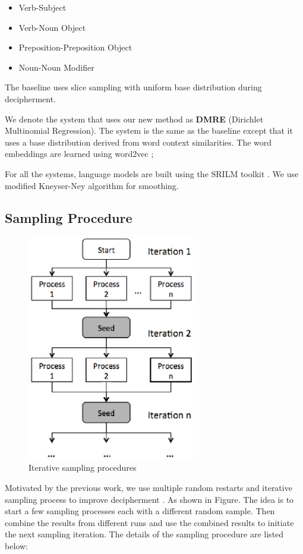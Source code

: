 \begin{itemize}
\item Verb-Subject
\item Verb-Noun Object
\item Preposition-Preposition Object
\item Noun-Noun Modifier
\end{itemize}

The baseline uses slice sampling with uniform base distribution during decipherment.

We denote the system that uses our new method as \textbf{DMRE} (Dirichlet Multinomial Regression). The system is the same as the baseline except that it uses a base distribution derived from word context similarities.  The word embeddings are learned using word2vec \cite{mikolov2013efficient};

For all the systems, language models are built using the SRILM toolkit \cite{srilm}. We use modified Kneyser-Ney \cite{KneserNey95} algorithm for smoothing.


\subsection{Sampling Procedure}
\label{sample_procedure}

 \begin{figure}[!ht]
  \centering
  \includegraphics[width=2.9in,height=3.9in]{iterative_sampling}
  \caption{Iterative sampling procedures}
\label{iterative_sampling}
\end{figure}

Motivated by the previous work, we use multiple random restarts and iterative sampling process to improve decipherment \cite{Dou:2012}. As shown in Figure. The idea is to start a few sampling processes each with a different random sample. Then combine the results from different runs and use the combined results to initiate the next sampling iteration. The details of the sampling procedure are listed below:

